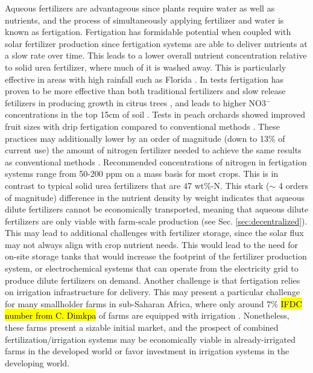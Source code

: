 Aqueous fertilizers are advantageous since plants require water as well as nutrients, and the process of simultaneously applying fertilizer and water is known as fertigation. Fertigation has formidable potential when coupled with solar fertilizer production since fertigation systems are able to deliver nutrients at a slow rate over time. This leads to a lower overall nutrient concentration relative to solid urea fertilizer, where much of it is washed away. This is particularly effective in areas with high rainfall such as Florida \cite{kadyampakeni_2015}. In tests fertigation has proven to be more effective than both traditional fertilizers and slow release fetilizers in producing growth in citrus trees \cite{Morgan2009}, and leads to higher NO3$^-$ concentrations in the top 15cm of soil \cite{Willis1991}. Tests in peach orchards showed improved fruit sizes with drip fertigation compared to conventional methods \cite{Bryla2005}. These practices may additionally lower by an order of magnitude (down to 13\% of current use) the amount of nitrogen fertilizer needed to achieve the same results as conventional methods \cite{kadyampakeni_2015}. 
Recommended concentrations of nitrogen in fertigation systems range from 50-200 ppm on a mass basis \needcite for most crops. This is in contrast to typical solid urea fertilizers that are 47 wt\%-N. This stark ($\sim$ 4 orders of magnitude) difference in the nutrient density by weight indicates that aqueous dilute fertilizers cannot be economically transported, meaning that aqueous dilute fertilizers are only viable with farm-scale production (see Sec. \ref{sec:decentralized}). This may lead to additional challenges with fertilizer storage, since the solar flux may not always align with crop nutrient needs. This would lead to the need for on-site storage tanks that would increase the footprint of the fertilizer production system, or electrochemical systems that can operate from the electricity grid to produce dilute fertilizers on demand. Another challenge is that fertigation relies on irrigation infrastructure for delivery. This may present a particular challenge for many smallholder farms in sub-Saharan Africa, where only around 7\% \hl{IFDC number from C. Dimkpa} of farms are equipped with irrigation \needcite. Nonetheless, these farms present a sizable initial market, and the prospect of combined fertilization/irrigation systems may be economically viable in already-irrigated farms in the developed world or favor investment in irrigation systems in the developing world.

